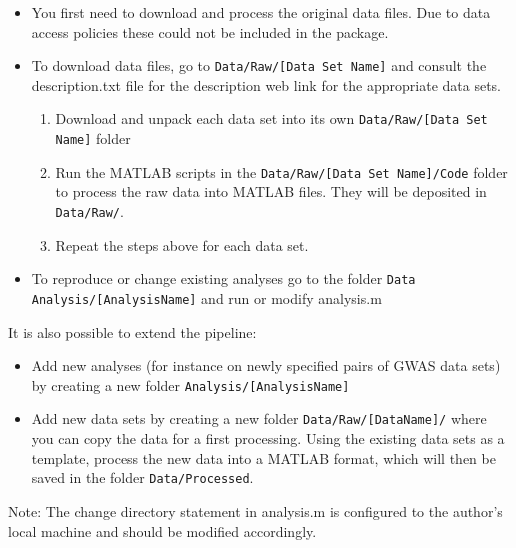 \documentclass[english,11pt]{article} %
\begin{document}
\begin{itemize}
\item You first need to download and process the original data files. Due to data access policies these could not be included in the package.
\item To download data files, go to \verb+Data/Raw/[Data Set Name]+ and consult the description.txt file for the description web link for the appropriate data sets.
\begin{enumerate}
\item Download and unpack each data set into its own \verb+Data/Raw/[Data Set Name]+ folder
\item Run the MATLAB scripts in the \verb+Data/Raw/[Data Set Name]/Code+ folder to process the raw data into MATLAB files. They will be deposited in \verb+Data/Raw/+.
\item Repeat the steps above for each data set.
\end{enumerate}
\item To reproduce or change existing analyses go to the folder \verb+Data Analysis/[AnalysisName]+ and run or modify analysis.m
\end{itemize}

It is also possible to extend the pipeline: 
\begin{itemize}
\item Add new analyses (for instance on newly specified pairs of GWAS data sets) by creating a new folder \verb+Analysis/[AnalysisName]+
\item Add new data sets by creating a new folder \verb+Data/Raw/[DataName]/+ where you can copy the data for a first processing. Using the existing data sets as a template, process the new data into a MATLAB format, which will then be saved in the folder \verb+Data/Processed+.
\end{itemize}

Note: The change directory statement in analysis.m is configured to the author's local machine and should be modified accordingly.



\end{document}
